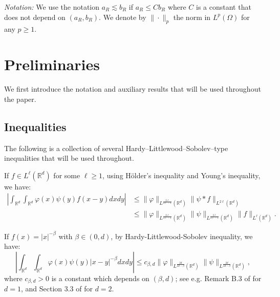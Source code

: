 \documentclass[12pt]{article}
\def\bR{\mathbb{R}}
\newcommand{\les}{\lesssim}
\begin{document}
\medskip

{\em Notation:} We use the notation $a_R \les b_R$ if $a_R \leq C b_R$ where $C$ is a constant that does not depend on $(a_R,b_R)$. We denote by $\| \cdot \|_p$ the norm in $L^p(\Omega)$ for any $p\geq 1$.

\section{Preliminaries}

We first introduce the notation and auxiliary results that will be used throughout the paper.

\subsection{Inequalities}

The following is a collection of several Hardy--Littlewood--Sobolev--type inequalities that will be used throughout.

\medskip

If $f \in L^{\ell}(\bR^d)$ for some $\ell \geq 1$, using H\"older's inequality and Young's inequality, we have:
\begin{align}
\nonumber
\left| \int_{\bR^d}\int_{\bR^d}\varphi(x)\psi(y) f(x-y)dxdy \right| & \leq \|\varphi\|_{L^{\frac{2\ell}{2\ell-1}}(\bR^d)} \| \psi * f\|_{L^{2\ell}(\bR^d)} \\
\label{LHS-Lell}
& \leq \|\varphi\|_{L^{\frac{2\ell}{2\ell-1}}(\bR^d)} \|\psi\|_{L^{\frac{2\ell}{2\ell-1}}(\bR^d)} \|f\|_{L^{\ell}(\bR^d)}.
\end{align}



If $f(x)=|x|^{-\beta}$ with $\beta \in (0,d)$, %
by Hardy-Littlewood-Sobolev inequality, we have:
\begin{equation*}
\left|\int_{\bR^d} \int_{\bR^d}\varphi(x) \psi(y) |x-y|^{-\beta} dxdy\right| \leq c_{\beta,d} \|\varphi\|_{L^{\frac{2d}{2d-\beta}}(\bR^d)} \|\psi\|_{L^{\frac{2d}{2d-\beta}}(\bR^d)},
\end{equation*}
where $c_{\beta,d}>0$ is a constant which depends on $(\beta,d)$; see e.g. Remark B.3 of \cite{BS26} for $d=1$, and Section 3.3 of \cite{BNZ} for $d=2$. 
\end{document}
